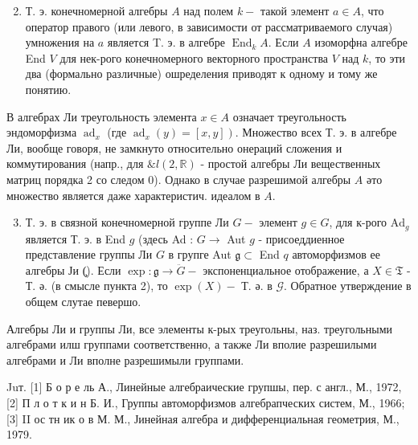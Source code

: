 \documentclass[10pt]{article}
\begin{document}
\begin{enumerate}

  \setcounter{enumi}{1}

  \item Т. э. конечномерной алгебры $A$ над полем $k-$ такой элемент $a \in A$, что оператор правого (или левого, в зависимости от рассматриваемого случая) умножения на $a$ является T. э. в алгебре $\operatorname{End}_{k} A$. Если $A$ изоморфна алгебре End $V$ для нек-рого конечномерного векторного пространства $V$ над $k$, то эти два (формально различные) ошределения приводят к одному и тому же понятию.

\end{enumerate}



В алгебрах Ли треугольность элемента $x \in A$ означает треугольность эндоморфизма $\operatorname{ad}_{x}$ (где $\left.\operatorname{ad}_{x}(y)=[x, y]\right)$. Множество всех Т. э. в алгебре Ли, вообще говоря, не замкнуто относительно онераций сложения и коммутирования (напр., для $\& l(2, \mathbb{R})$ - простой алгебры Ли вещественных матриц порядка 2 со следом 0). Однако в случае разрешимой алгебры $A$ әто множество является даже характеристич. идеалом в $A$.



\begin{enumerate}

  \setcounter{enumi}{2}

  \item Т. э. в связной конечномерной группе Ли $G-$ элемент $g \in G$, для к-рого $\mathrm{Ad}_{g}$ является Т. э. в End $g$ (здесь Ad : $G \rightarrow$ Aut $g$ - присоеддиенное представление группы Ли $G$ в групге Aut $\mathfrak{g} \subset$ End $q$ автоморфизмов ее алгебры Ји (̧). Если $\exp : \mathfrak{g} \rightarrow \ddot{G}-$ экспоненциальное отображение, а $X \in \mathfrak{T}$ - Т. ә. (в смысле пункта 2), то $\exp (X)-$ Т. ә. в $\mathscr{G}$. Обратное утверждение в общем слутае певершо.

\end{enumerate}



Алгебры Ли и группы Ли, все элементы к-рых треугольны, наз. треугольными алгебрами илш группами соответственно, а также Ли вполие разрешилыми алгебрами и Ли вполне разрешимыли группами.



Juт. [1] Б о р е ль А., Линейные алгебраические групшы, пер. с англ., М., 1972, [2] П л о т к и н Б. И., Группы автоморфизмов алгебрапческих систем, М., 1966; [3] II ос тн ик о в М. М., Јинейная алгебра и дифференциальная геометрия, М., 1979.
\end{document}
